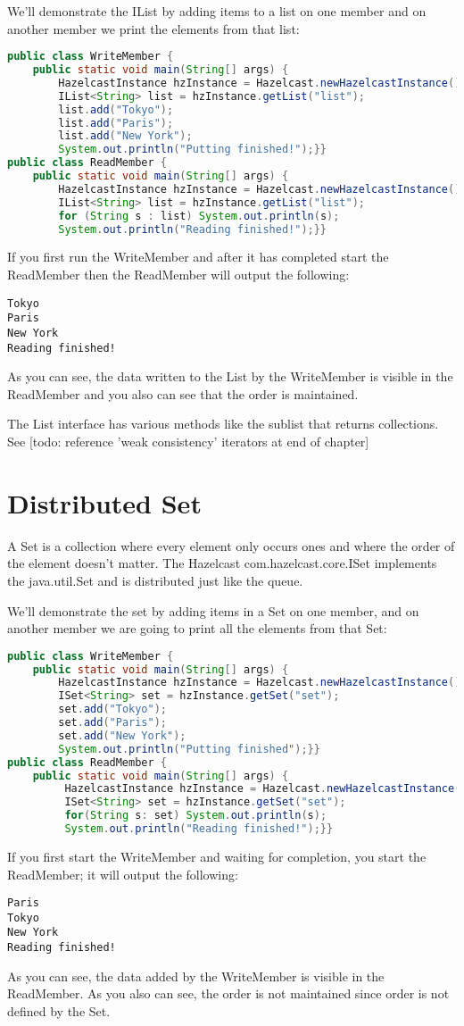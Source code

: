 We'll demonstrate the IList by adding items to a list on one member and on another member we print the elements from that list:
\begin{lstlisting}[language=java]
public class WriteMember {
    public static void main(String[] args) {
        HazelcastInstance hzInstance = Hazelcast.newHazelcastInstance();
        IList<String> list = hzInstance.getList("list");
        list.add("Tokyo");
        list.add("Paris");
        list.add("New York");
        System.out.println("Putting finished!");}}
public class ReadMember {
    public static void main(String[] args) {
        HazelcastInstance hzInstance = Hazelcast.newHazelcastInstance();
        IList<String> list = hzInstance.getList("list");
        for (String s : list) System.out.println(s);
        System.out.println("Reading finished!");}}
\end{lstlisting}
If you first run the WriteMember and after it has completed start the ReadMember then the ReadMember will output the following:
\begin{lstlisting}
Tokyo
Paris
New York
Reading finished!
\end{lstlisting}
As you can see, the data written to the List by the WriteMember is visible in the ReadMember and you also can see that the order is maintained.

The List interface has various methods like the sublist that returns collections. See [todo: reference 'weak consistency' iterators at end of chapter]

\section{Distributed Set}
A Set is a collection where every element only occurs ones and where the order of the element doesn't matter. The Hazelcast com.hazelcast.core.ISet implements the java.util.Set and is distributed just like the queue.

We'll demonstrate the set by adding items in a Set on one member, and on another member we are going to print all the elements from that Set:
\begin{lstlisting}[language=java]
public class WriteMember {
    public static void main(String[] args) {
        HazelcastInstance hzInstance = Hazelcast.newHazelcastInstance();
        ISet<String> set = hzInstance.getSet("set");
        set.add("Tokyo");
        set.add("Paris");
        set.add("New York");
        System.out.println("Putting finished");}}
public class ReadMember {
    public static void main(String[] args) {
         HazelcastInstance hzInstance = Hazelcast.newHazelcastInstance();
         ISet<String> set = hzInstance.getSet("set");
         for(String s: set) System.out.println(s);
         System.out.println("Reading finished!");}}
\end{lstlisting}
If you first start the WriteMember and waiting for completion, you start the ReadMember; it will output the following:
\begin{lstlisting}
Paris
Tokyo
New York
Reading finished!	
\end{lstlisting}
As you can see, the data added by the WriteMember is visible in the ReadMember. As you also can see, the order is not maintained since order is not defined by the Set.

